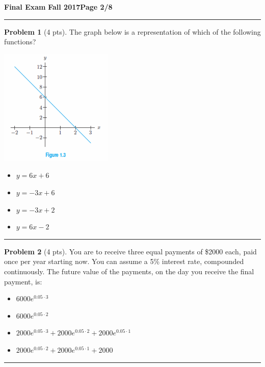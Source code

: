 \documentclass[12pt]{article}
\makeatletter
\theoremstyle{definition}
\newtheorem{problem}{Problem}
\newcommand*{\radiobutton}{%
  \@ifstar{\@radiobutton0}{\@radiobutton1}%
}
\newcommand*{\@radiobutton}[1]{%
  \begin{tikzpicture}
    \pgfmathsetlengthmacro\radius{height("X")/2}
    \draw[radius=\radius] circle;
    \ifcase#1 \fill[radius=.6*\radius] circle;\fi
  \end{tikzpicture}%
}
\makeatother
\begin{document}
\hfill{\large\bf Final Exam}\hfill{\large\bf
  Fall 2017}\hfill{\large\bf Page 2/8}\hrule

\bigskip

\begin{problem}[4 pts]
The graph below is a representation of which of the following functions?
\begin{multicols}{2}
\begin{center}
\includegraphics{1graph2.png}
\end{center}
\begin{itemize}
\item[\radiobutton] $y=6x+6$
\item[\radiobutton] $y=-3x+6$
\item[\radiobutton] $y=-3x+2$
\item[\radiobutton] $y=6x-2$
\end{itemize}
\end{multicols}
\end{problem}

\hrule
\begin{problem}[4 pts]
You are to receive three equal payments of \$2000 each, paid once per year starting now. You can assume a 5\% interest rate, compounded continuously. The future value of the payments, on the day you receive the final payment, is:
\begin{itemize}
\item[\radiobutton] $6000 e^{0.05 \cdot 3}$
\item[\radiobutton] $6000 e^{0.05 \cdot 2}$
\item[\radiobutton] $2000 e^{0.05 \cdot 3} + 2000 e^{0.05 \cdot 2} + 2000 e^{0.05 \cdot 1}$
\item[\radiobutton] $2000 e^{0.05 \cdot 2} + 2000 e^{0.05 \cdot 1} + 2000$
\end{itemize}
\end{problem}
\hrule
\end{document}
